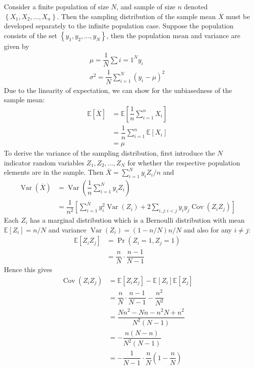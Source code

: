 \documentclass[11pt]{report} %
\begin{document}
Consider a finite population of size $N$, and sample of size $n$ denoted $\left\{X_{1}, X_{2}, \dots, X_{n}\right\}$. Then the sampling distribution of the sample mean $\overline{X}$ must be developed separately to the infinite population case. Suppose the population consists of the set $\left\{y_{1}, y_{2}, \dots, y_{N}\right\}$, then the population mean and variance are given by
\begin{gather}
\mu = \dfrac{1}{N}\sum{i = 1}^{N}y_{i} \\
\sigma^{2} = \dfrac{1}{N}\sum_{i = 1}^{N}\left(y_{i} - \mu\right)^{2}
\end{gather}
Due to the linearity of expectation, we can show for the unbiasedness of the sample mean:
\begin{align}
\mathbb{E}\left[\overline{X}\right] &= \mathbb{E}\left[\dfrac{1}{n}\sum_{i = 1}^{n}X_{i}\right] \\
&= \dfrac{1}{n}\sum_{i = 1}^{n}\mathbb{E}\left[X_{i}\right] \\
&= \mu
\end{align}
To derive the variance of the sampling distribution, first introduce the $N$ indicator random variables $Z_{1}, Z_{2}, \dots, Z_{N}$ for whether the respective population elements are in the sample. Then $\overline{X} = \sum_{i = 1}^{N}y_{i}Z_{i}/n$ and
\begin{align}
\operatorname{Var}\left(\overline{X}\right) &= \operatorname{Var}\left(\dfrac{1}{n}\sum_{i = 1}^{N}y_{i}Z_{i}\right) \\
&= \dfrac{1}{n^{2}}\left[\sum_{i = 1}^{N}y_{i}^{2}\operatorname{Var}\left(Z_{i}\right) + 2\sum_{i, j: i < j}y_{i}y_{j}\operatorname{Cov}\left(Z_{i}Z_{j}\right)\right]
\end{align}
Each $Z_{i}$ has a marginal distribution which is a Bernoulli distribution with mean $\mathbb{E}\left[Z_{i}\right] = n/N$ and variance $\operatorname{Var}\left(Z_{i}\right) = \left(1 - n/N\right)n/N$ and also for any $i \neq j$:
\begin{align}
\mathbb{E}\left[Z_{i}Z_{j}\right] &= \operatorname{Pr}\left(Z_{i} = 1, Z_{j} = 1\right) \\
&= \dfrac{n}{N}\cdot\dfrac{n - 1}{N - 1}
\end{align}
Hence this gives
\begin{align}
\operatorname{Cov}\left(Z_{i}Z_{j}\right) &= \mathbb{E}\left[Z_{i}Z_{j}\right] - \mathbb{E}\left[Z_{i}\right]\mathbb{E}\left[Z_{j}\right] \\
&= \dfrac{n}{N}\cdot\dfrac{n - 1}{N - 1} - \dfrac{n^{2}}{N^{2}} \\
&= \dfrac{Nn^{2} - Nn - n^{2}N + n^{2}}{N^{2}\left(N - 1\right)} \\
&= - \dfrac{n\left(N - n\right)}{N^{2}\left(N - 1\right)} \\
&= -\dfrac{1}{N - 1}\cdot\dfrac{n}{N}\left(1 - \dfrac{n}{N}\right)
\end{align}
\end{document}
